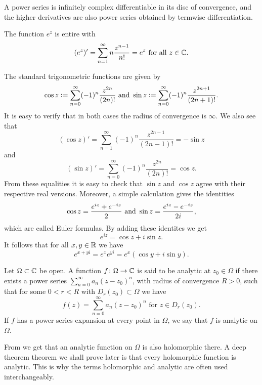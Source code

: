 \documentclass[11pt,a4paper]{article}
\begin{document}
\begin{corollary}
  \label{cor:infinitely-differentiable}
  A power series is infinitely complex differentiable in its disc of
  convergence, and the higher derivatives are also power series obtained 
  by termwise differentiation.
\end{corollary}

\begin{example}
  The function $e^z$ is entire with
  \[
    (e^z)' = \sum_{n=1}^{\infty} n \frac{z^{n-1}}{n!} = e^z
    \text{ for all } z \in \mathbb{C}.
  \]
\end{example}

\begin{example}
  \label{exmp:std-trigonometric-functions}
  The standard trigonometric functions are given by
  \[
    \cos z := \sum_{n=0}^{\infty} (-1)^n \frac{z^{2n}}{(2n)!} \text{ and }
    \sin z := \sum_{n=0}^{\infty} (-1)^n \frac{z^{2n+1}}{(2n+1)!}.
  \]
  It is easy to verify that in both cases the radius of convergence
  is $\infty$.
  We also see that
  \[
    (\cos z)' = \sum_{n=1}^{\infty} (-1)^n \frac{z^{2n-1}}{(2n-1)!} = - \sin z
  \]
  and
  \[
    (\sin z)' = \sum_{n=0}^{\infty} (-1)^n \frac{z^{2n}}{(2n)!} = \cos z.
  \]
  From these equalities it is easy to check that $\sin z$ and $\cos z$ agree
  with their respective real versions.
  Moreover, a simple calculation gives the identities
  \[
    \cos z = \frac{e^{iz} + e^{-iz}}{2} \text{ and }
    \sin z = \frac{e^{iz} - e^{-iz}}{2 i},
  \]
  which are called Euler formulas.
  By adding these identites we get
  \[
    e^{iz} = \cos z + i \sin z.
  \]
  It follows that for all $x,y \in \mathbb{R}$ we have
  \[
    e^{x + y i} = e^x e^{y i} = e^x (\cos y + i \sin y).
  \]
\end{example}

\begin{definition}
  Let $\Omega \subset \mathbb{C}$ be open.
  A function $f \colon \Omega \to \mathbb{C}$ is said to be analytic at
  $z_0 \in \Omega$ if there exists a power series
  $\sum_{n=0}^{\infty} a_n (z - z_0)^n$,
  with radius of convergence $R > 0$, such that for some $0 < r < R$
  with $D_r(z_0) \subset \Omega$ we have
  \[
    f(z) = \sum_{n=0}^{\infty} a_n (z - z_0)^n \text{ for } z \in D_r(z_0).
  \]
  If $f$ has a power series expansion at every point in $\Omega$,
  we say that $f$ is analytic on $\Omega$.
\end{definition}

\begin{remark}
  From  we get that an analytic function on $\Omega$
  is also holomorphic there. 
  A deep theorem theorem we shall prove later is that every holomorphic 
  function is analytic.
  This is why the terms holomorphic and analytic are often used interchangeably.
\end{remark}
\end{document}
